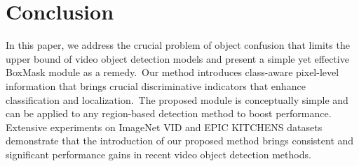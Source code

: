 \documentclass[10pt,twocolumn,letterpaper]{article}
\begin{document}
\section{Conclusion}
In this paper, we address the crucial problem of object confusion that limits the upper bound of video object detection models and present a simple yet effective BoxMask module as a remedy.~Our method introduces class-aware pixel-level information that brings crucial discriminative indicators that enhance classification and localization.~The proposed module is conceptually simple and can be applied to any region-based detection method to boost performance. Extensive experiments on ImageNet VID and EPIC KITCHENS datasets demonstrate that the introduction of our proposed method brings consistent and significant performance gains in recent video object detection methods.

{\small


}
\end{document}
